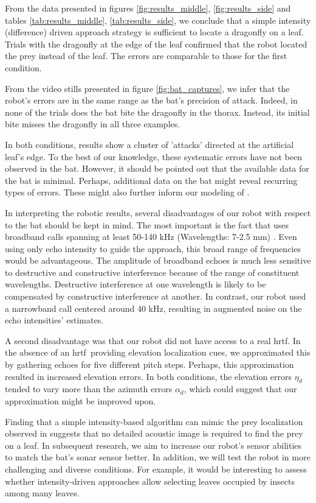 \documentclass[letterpaper]{article}
\newcommand{\azimuth}{\alpha}
\newcommand{\elevation}{\eta}
\newcommand{\hrtf}{\gls{hrtf}}
\begin{document}
From the data presented in figures \ref{fig:results_middle}, \ref{fig:results_side} and tables \ref{tab:results_middle}, \ref{tab:results_side}, we conclude that a simple intensity (difference) driven approach strategy is sufficient to locate  a dragonfly on a leaf. Trials with the dragonfly at the edge of the leaf confirmed that the robot located the prey instead of the leaf. The errors are comparable to those for the first condition.

From the video stills presented in figure \ref{fig:bat_captures}, we infer that the robot's errors are in the same range as the bat's precision of attack. Indeed, in none of the trials does the bat bite the dragonfly in the thorax. Instead, its initial bite misses the dragonfly in all three examples.

In both conditions, results show a cluster of 'attacks' directed at the artificial leaf's edge. To the best of our knowledge, these systematic errors have not been observed in the bat. However, it should be pointed out that the available data for the bat is minimal. Perhaps, additional data on the bat might reveal recurring types of errors. These might also further inform our modeling of .

In interpreting the robotic results, several disadvantages of our robot with respect to the bat should be kept in mind. The most important is the fact that  uses broadband calls spanning at least 50-140 kHz (Wavelengths: 7-2.5 mm) \cite{Geipel2019}. Even using only echo intensity to guide the approach, this broad range of frequencies would be advantageous. The amplitude of broadband echoes is much less sensitive to destructive and constructive interference because of the range of constituent wavelengths. Destructive interference at one wavelength is likely to be compensated by constructive interference at another. In contrast, our robot used a narrowband call centered around 40 kHz, resulting in augmented noise on the echo intensities' estimates. 

A second disadvantage was that our robot did not have access to a real \hrtf. In the absence of an \hrtf\ providing elevation localization cues, we approximated this by gathering echoes for five different pitch steps. Perhaps, this approximation resulted in increased elevation errors. In both conditions, the elevation errors $\elevation_d$ tended to vary more than the azimuth errors $\azimuth_d$, which could suggest that our approximation might be improved upon.

Finding that a simple intensity-based algorithm can mimic the prey localization observed in   suggests that no detailed acoustic image \citep{Geipel2013} is required to find the prey on a leaf. In subsequent research, we aim to increase our robot's sensor abilities to match the bat's sonar sensor better. In addition, we will test the robot in more challenging and diverse conditions. For example, it would be interesting to assess whether intensity-driven approaches allow selecting leaves occupied by insects among many leaves.

\footnotesize

\end{document}
